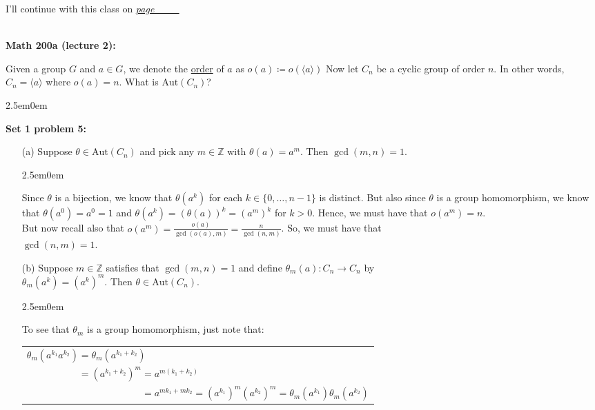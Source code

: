 \documentclass{book}
\newcommand{\inLinkRap}[2]{{\color{blue}\hyperlink{#1}{\textit{#2}}}}
\newcommand{\hTwo}{%
\color{Black}%
   \fontsize{13}{15}\selectfont%
}
\newcommand{\Hstatement}{%
   \color{MidnightBlue!90!Black}%
   \fontsize{12}{13}\selectfont%
}
\newcommand{\HexOne}{%
   \color{Purple}%
   \fontsize{12}{13}\selectfont%
}
\newenvironment{myIndent}{%
   \begin{adjustwidth}{2.5em}{0em}%
}{%
   \end{adjustwidth}%
}
\newcommand{\udefine}[1]{{%
   \setulcolor{Red}%
   \setul{0.14em}{0.07em}%
   \ul{#1}%
}}
\newcommand{\blab}[1]{\textbf{#1}}
\newcommand{\blect}[1]{{\color{MidnightBlue}\textbf{#1}}}
\newcommand{\Aut}{\mathrm{Aut}}
\newcommand{\mySepTwo}[1][.]{%
   {\noindent\color{#1}{\rule{6.5in}{0.5mm}}}\\%
}
\newcommand{\retTwo}{\hfill\bigbreak}
\begin{document}
\hTwo I'll continue with this class on \inLinkRap{math 220a lecture 2}{page \_\_\_}

\mySepTwo

\blect{Math 200a (lecture 2):}\retTwo

Given a group $G$ and $a \in G$, we denote the \udefine{order} of $a$ as $o(a) \coloneqq o(\langle a \rangle)$
Now let $C_n$ be a cyclic group of order $n$. In other words, $C_n = \langle a \rangle$ where $o(a) = n$. What is $\Aut(C_n)$?\\ [-6pt]

\begin{myIndent}\Hstatement
	\blab{Set 1 problem 5:}
	\begin{itemize}
		\item[(a)] Suppose $\theta \in \Aut(C_n)$ and pick any $m \in \mathbb{Z}$ with $\theta(a) = a^m$. Then $\gcd(m, n) = 1$.
		
		\begin{myIndent}\HexOne
			Since $\theta$ is a bijection, we know that $\theta(a^k)$ for each $k \in \{0, \ldots, n-1\}$ is distinct. But also since $\theta$ is a group homomorphism, we know that $\theta(a^0) = a^0 = 1$ and $\theta(a^k) = (\theta(a))^k = (a^m)^k$ for $k > 0$. Hence, we must have that $o(a^m) = n$.\\ [-1pt] But now recall also that $o(a^m) = \frac{o(a)}{\gcd(o(a), m)} = \frac{n}{\gcd(n, m)}$. So, we must have that\\ [-3pt] $\gcd(n, m) = 1$.\newpage
		\end{myIndent}

		\item[(b)] Suppose $m \in \mathbb{Z}$ satisfies that $\gcd(m, n) = 1$ and define $\theta_m(a): C_n \to C_n$ by\\ $\theta_m(a^k) = (a^k)^m$. Then $\theta \in \Aut(C_n)$.
		
		\begin{myIndent}\HexOne
			To see that $\theta_m$ is a group homomorphism, just note that:
			
			{\centering\begin{tabular}{l}
				$\theta_m(a^{k_1}a^{k_2}) = \theta_m(a^{k_1 + k_2})$\\
				$\phantom{\theta_m(a^{k_1}a^{k_2})} = (a^{k_1 + k_2})^m = a^{m(k_1 + k_2)}$\\
				$\phantom{\theta_m(a^{k_1}a^{k_2}) = (a^{k_1 + k_2})^m} = a^{mk_1 + mk_2} = (a^{k_1})^m (a^{k_2})^m = \theta_m(a^{k_1})\theta_m(a^{k_2})$
			\end{tabular}\retTwo\par}


\end{myIndent}
\end{itemize}
\end{myIndent}
\end{document}
